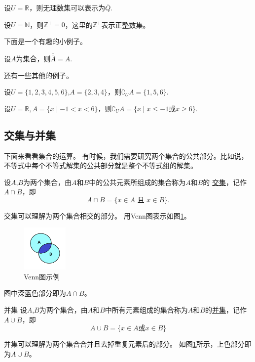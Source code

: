 \documentclass[lang=cn,math=cm,chinesefont=nofont,11pt,scheme=chinese,twocol]{elegantbook}
\begin{document}
\begin{example}
  设$U=\mathbb{R}$，则无理数集可以表示为$\overline{Q}$.
\end{example}

\begin{example}
  设$U=\mathbb{N}$，则$\overline{\mathbb{Z}^+}={0}$，这里的$\mathbb{Z}^+$表示正整数集。
\end{example}

下面是一个有趣的小例子。

\begin{example}
  设$A$为集合，则$\overline{\overline{A}}=A$.
\end{example}

还有一些其他的例子。

\begin{example}
  设$U=\{1,2,3,4,5,6\}$,$A=\{2,3,4\}$，则$\complement_{U}A=\{1,5,6\}.$
\end{example}

\begin{example}
  设$U=\mathbb{R},A=\{x\mid -1<x<6\}$，则$\complement_{U}A=\{x\mid x\leq -1\text{或}x\geq 6\}.$
\end{example}

\subsection{交集与并集}
下面来看看集合的运算。
有时候，我们需要研究两个集合的公共部分。比如说，不等式中每个不等式解集的公共部分就是整个不等式组的解集。
\begin{definition}[交集]
  设$A$,$B$为两个集合，由$A$和$B$中的公共元素所组成的集合称为$A$和$B$的
  \underline{交集}，记作$A\cap B$，即$$A\cap B=\{x\in A\text{ 且 }x\in B\}.$$
\end{definition}
  交集可以理解为两个集合相交的部分。
  用Venn图表示如图\ref{img:Venn2}。
  \begin{figure}[h]
    \centering
    \includegraphics[width=0.2\textwidth]{image/Venn2.png}
    \caption{Venn图示例}
    \label{img:Venn2}
  \end{figure}
  图中深蓝色部分即为$A\cap B$。

\begin{definition}{并集}
  设$A$,$B$为两个集合，由$A$和$B$中所有元素组成的集合称为$A$和$B$的\underline{并集}，记作$A\cup B$，即
  $$A\cup B=\{x\in A\text{或}x\in B\}$$
\end{definition}
  并集可以理解为两个集合合并且去掉重复元素后的部分。
  如图\ref{img:Venn2}所示，上色部分即为$A\cup B$。 
\end{document}
